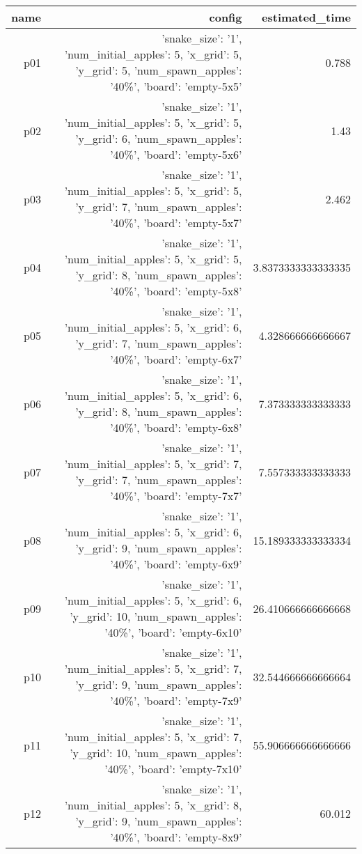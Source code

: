 \documentclass{article}
\begin{document}
                            \begin{center}
                            \scriptsize
                            \begin{tabular}{r|r|r}
                            name & config & estimated\_time\\\midrule
                              p01&{'snake\_size': '1', 'num\_initial\_apples': 5, 'x\_grid': 5, 'y\_grid': 5, 'num\_spawn\_apples': '40\%', 'board': 'empty-5x5'}&0.788\\
  p02&{'snake\_size': '1', 'num\_initial\_apples': 5, 'x\_grid': 5, 'y\_grid': 6, 'num\_spawn\_apples': '40\%', 'board': 'empty-5x6'}&1.43\\
  p03&{'snake\_size': '1', 'num\_initial\_apples': 5, 'x\_grid': 5, 'y\_grid': 7, 'num\_spawn\_apples': '40\%', 'board': 'empty-5x7'}&2.462\\
  p04&{'snake\_size': '1', 'num\_initial\_apples': 5, 'x\_grid': 5, 'y\_grid': 8, 'num\_spawn\_apples': '40\%', 'board': 'empty-5x8'}&3.8373333333333335\\
  p05&{'snake\_size': '1', 'num\_initial\_apples': 5, 'x\_grid': 6, 'y\_grid': 7, 'num\_spawn\_apples': '40\%', 'board': 'empty-6x7'}&4.328666666666667\\
  p06&{'snake\_size': '1', 'num\_initial\_apples': 5, 'x\_grid': 6, 'y\_grid': 8, 'num\_spawn\_apples': '40\%', 'board': 'empty-6x8'}&7.373333333333333\\
  p07&{'snake\_size': '1', 'num\_initial\_apples': 5, 'x\_grid': 7, 'y\_grid': 7, 'num\_spawn\_apples': '40\%', 'board': 'empty-7x7'}&7.557333333333333\\
  p08&{'snake\_size': '1', 'num\_initial\_apples': 5, 'x\_grid': 6, 'y\_grid': 9, 'num\_spawn\_apples': '40\%', 'board': 'empty-6x9'}&15.189333333333334\\
  p09&{'snake\_size': '1', 'num\_initial\_apples': 5, 'x\_grid': 6, 'y\_grid': 10, 'num\_spawn\_apples': '40\%', 'board': 'empty-6x10'}&26.410666666666668\\
  p10&{'snake\_size': '1', 'num\_initial\_apples': 5, 'x\_grid': 7, 'y\_grid': 9, 'num\_spawn\_apples': '40\%', 'board': 'empty-7x9'}&32.544666666666664\\
  p11&{'snake\_size': '1', 'num\_initial\_apples': 5, 'x\_grid': 7, 'y\_grid': 10, 'num\_spawn\_apples': '40\%', 'board': 'empty-7x10'}&55.906666666666666\\
  p12&{'snake\_size': '1', 'num\_initial\_apples': 5, 'x\_grid': 8, 'y\_grid': 9, 'num\_spawn\_apples': '40\%', 'board': 'empty-8x9'}&60.012\\

\end{tabular}
\end{center}
\end{document}
